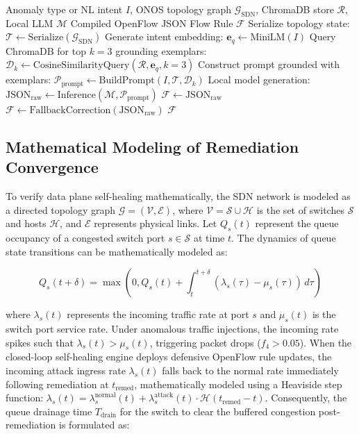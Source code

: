 \documentclass[conference]{IEEEtran}
\begin{document}
\begin{algorithm}[h]
\caption{RAG-Grounded Intent Compilation}
\label{alg:rag_compilation}
\footnotesize
\begin{algorithmic}[1]
\REQUIRE Anomaly type or NL intent $I$, ONOS topology graph $\mathcal{G}_{\text{SDN}}$, ChromaDB store $\mathcal{R}$, Local LLM $\mathcal{M}$
\ENSURE Compiled OpenFlow JSON Flow Rule $\mathcal{F}$
\STATE Serialize topology state: $\mathcal{T} \leftarrow \text{Serialize}(\mathcal{G}_{\text{SDN}})$
\STATE Generate intent embedding: $\mathbf{e}_q \leftarrow \text{MiniLM}(I)$
\STATE Query ChromaDB for top $k=3$ grounding exemplars:
\STATE \quad $\mathcal{D}_k \leftarrow \text{CosineSimilarityQuery}(\mathcal{R}, \mathbf{e}_q, k=3)$
\STATE Construct prompt grounded with exemplars:
\STATE \quad $\mathcal{P}_{\text{prompt}} \leftarrow \text{BuildPrompt}(I, \mathcal{T}, \mathcal{D}_k)$
\STATE Local model generation: $\text{JSON}_{\text{raw}} \leftarrow \text{Inference}(\mathcal{M}, \mathcal{P}_{\text{prompt}})$
    \STATE $\mathcal{F} \leftarrow \text{JSON}_{\text{raw}}$
\ELSE
    \STATE $\mathcal{F} \leftarrow \text{FallbackCorrection}(\text{JSON}_{\text{raw}})$
\ENDIF
\STATE \RETURN $\mathcal{F}$
\end{algorithmic}
\end{algorithm}

\subsection{Mathematical Modeling of Remediation Convergence}
To verify data plane self-healing mathematically, the SDN network is modeled as a directed topology graph $\mathcal{G} = (\mathcal{V}, \mathcal{E})$, where $\mathcal{V} = \mathcal{S} \cup \mathcal{H}$ is the set of switches $\mathcal{S}$ and hosts $\mathcal{H}$, and $\mathcal{E}$ represents physical links. Let $Q_s(t)$ represent the queue occupancy of a congested switch port $s \in \mathcal{S}$ at time $t$. The dynamics of queue state transitions can be mathematically modeled as:

\begin{equation}
Q_s(t + \delta) = \max \left(0, Q_s(t) + \int_{t}^{t+\delta} (\lambda_s(\tau) - \mu_s(\tau)) \, d\tau \right)
\end{equation}

where $\lambda_s(t)$ represents the incoming traffic rate at port $s$ and $\mu_s(t)$ is the switch port service rate. Under anomalous traffic injections, the incoming rate spikes such that $\lambda_s(t) > \mu_s(t)$, triggering packet drops ($f_4 > 0.05$). When the closed-loop self-healing engine deploys defensive OpenFlow rule updates, the incoming attack ingress rate $\lambda_s(t)$ falls back to the normal rate immediately following remediation at $t_{\text{remed}}$, mathematically modeled using a Heaviside step function: $\lambda_s(t) = \lambda_s^{\text{normal}}(t) + \lambda_s^{\text{attack}}(t) \cdot \mathcal{H}(t_{\text{remed}} - t)$. Consequently, the queue drainage time $T_{\text{drain}}$ for the switch to clear the buffered congestion post-remediation is formulated as:
\end{document}
